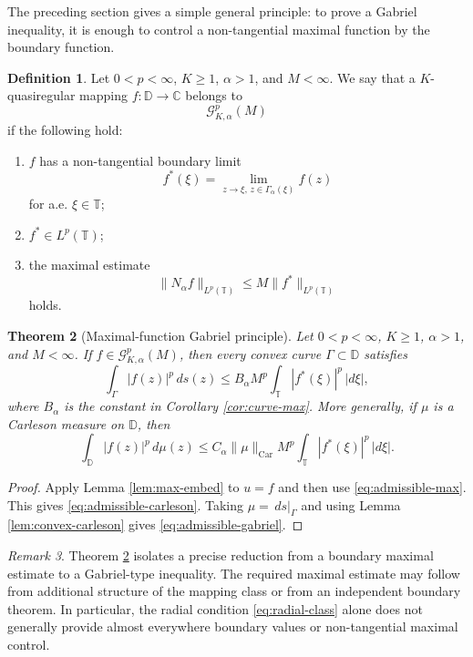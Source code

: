 \documentclass[11pt]{article}
\newtheorem{theorem}{Theorem}[section]
\theoremstyle{definition}
\newtheorem{definition}[theorem]{Definition}
\theoremstyle{remark}
\newtheorem{remark}[theorem]{Remark}
\newcommand{\D}{\mathbb D}
\newcommand{\T}{\mathbb T}
\newcommand{\C}{\mathbb C}
\newcommand{\ds}{\,ds}
\newcommand{\Car}{\operatorname{Car}}
\begin{document}
The preceding section gives a simple general principle: to prove a Gabriel inequality, it is enough to control a non-tangential maximal function by the boundary function.

\begin{definition}\label{def:admissible}
Let $0<p<\infty$, $K\ge1$, $\alpha>1$, and $M<\infty$. We say that a $K$-quasiregular mapping $f:\D\to\C$ belongs to
\[
   \mathcal G^p_{K,\alpha}(M)
\]
if the following hold:
\begin{enumerate}[label=(\roman*)]
\item $f$ has a non-tangential boundary limit
\[
   f^*(\xi)=\lim_{z\to\xi,\,z\in\Gamma_\alpha(\xi)}f(z)
\]
for a.e. $\xi\in\T$;
\item $f^*\in L^p(\T)$;
\item the maximal estimate
\begin{equation}\label{eq:admissible-max}
   \|N_\alpha f\|_{L^p(\T)}
   \le M\|f^*\|_{L^p(\T)}
\end{equation}
holds.
\end{enumerate}
\end{definition}

\begin{theorem}[Maximal-function Gabriel principle]\label{thm:admissible}
Let $0<p<\infty$, $K\ge1$, $\alpha>1$, and $M<\infty$. If $f\in\mathcal G^p_{K,\alpha}(M)$, then every convex curve $\Gamma\subset\D$ satisfies
\begin{equation}\label{eq:admissible-gabriel}
   \int_\Gamma |f(z)|^p\ds(z)
   \le B_\alpha M^p
      \int_\T |f^*(\xi)|^p\,|d\xi|,
\end{equation}
where $B_\alpha$ is the constant in Corollary \ref{cor:curve-max}. More generally, if $\mu$ is a Carleson measure on $\D$, then
\begin{equation}\label{eq:admissible-carleson}
   \int_\D |f(z)|^p\,d\mu(z)
   \le C_\alpha\|\mu\|_{\Car}M^p
      \int_\T |f^*(\xi)|^p\,|d\xi|.
\end{equation}
\end{theorem}

\begin{proof}
Apply Lemma \ref{lem:max-embed} to $u=f$ and then use \eqref{eq:admissible-max}. This gives \eqref{eq:admissible-carleson}. Taking $\mu=\ds|_\Gamma$ and using Lemma \ref{lem:convex-carleson} gives \eqref{eq:admissible-gabriel}.
\end{proof}

\begin{remark}\label{rem:scope}
Theorem \ref{thm:admissible} isolates a precise reduction from a boundary maximal estimate to a Gabriel-type inequality. The required maximal estimate may follow from additional structure of the mapping class or from an independent boundary theorem. In particular, the radial condition \eqref{eq:radial-class} alone does not generally provide almost everywhere boundary values or non-tangential maximal control.
\end{remark}
\end{document}
